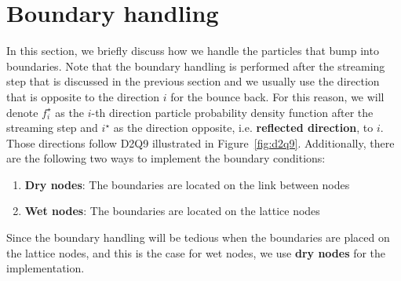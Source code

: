 \section{Boundary handling}
In this section, we briefly discuss how we handle
the particles that bump into boundaries.
Note that the boundary handling is performed
after the streaming step that is discussed in the previous section
and we usually use the direction that is opposite to
the direction $i$ for the bounce back.
For this reason, we will denote
$f^\star_i$ as the $i$-th direction
particle probability density function
after the streaming step
and $i^\star$ as the direction opposite,
i.e. {\bf reflected direction}, to $i$.
Those directions follow D2Q9 illustrated
in Figure~\ref{fig:d2q9}.
Additionally, there are the following
two ways to
implement the boundary conditions\cite{liu2014lattice}:
\begin{enumerate}
  \item {\bf Dry nodes}:
  The boundaries are located on the link between nodes
  \item {\bf Wet nodes}:
  The boundaries are located on the lattice nodes
\end{enumerate}
Since the boundary handling will be tedious when
the boundaries are placed on the lattice nodes,
and this is the case for wet nodes,
we use {\bf dry nodes} for the implementation.

